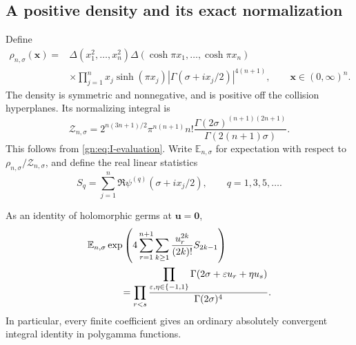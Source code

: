 \subsection{A positive density and its exact normalization}

Define
\begin{equation}\label{gn:eq:density}
\begin{split}
 \rho_{n,\sigma}(\mathbf x)
 ={}&\Delta(x_1^2,\ldots,x_n^2)
      \Delta(\cosh\pi x_1,\ldots,\cosh\pi x_n)\\
 &\times\prod_{j=1}^n x_j\sinh(\pi x_j)
              |\Gamma(\sigma+ix_j/2)|^{4(n+1)},
 \qquad \mathbf x\in(0,\infty)^n.
\end{split}
\end{equation}
The density is symmetric and nonnegative, and is positive off the
collision hyperplanes.  Its normalizing integral is
\begin{equation}\label{gn:eq:Z}
 \mathcal Z_{n,\sigma}
 =2^{n(3n+1)/2}\pi^{n(n+1)}n!
       \frac{\Gamma(2\sigma)^{(n+1)(2n+1)}}
            {\Gamma(2(n+1)\sigma)}.
\end{equation}
This follows from \eqref{gn:eq:I-evaluation}.  Write $\mathbb E_{n,\sigma}$
for expectation with respect to $\rho_{n,\sigma}/\mathcal Z_{n,\sigma}$,
and define the real linear statistics
\begin{equation}\label{gn:eq:statistics}
 S_q=\sum_{j=1}^n\Re\psi^{(q)}(\sigma+ix_j/2),
                   \qquad q=1,3,5,\ldots.
\end{equation}

\begin{theorem}
\label{gn:thm:polygamma-germ}
As an identity of holomorphic germs at $\mathbf u=\mathbf0$,
\begin{equation}\label{gn:eq:polygamma-germ}
\begin{split}
 &\mathbb E_{n,\sigma}
  \exp\left(4\sum_{r=1}^{n+1}\sum_{k\ge1}
                   \frac{u_r^{2k}}{(2k)!}S_{2k-1}\right)\\
 &\hspace{12mm}=
 \prod_{r<s}
   \frac{\displaystyle\prod_{\varepsilon,\eta\in\{-1,1\}}
         \Gamma(2\sigma+\varepsilon u_r+\eta u_s)}
        {\Gamma(2\sigma)^4}.
\end{split}
\end{equation}
In particular, every finite coefficient gives an ordinary absolutely
convergent integral identity in polygamma functions.
\end{theorem}

